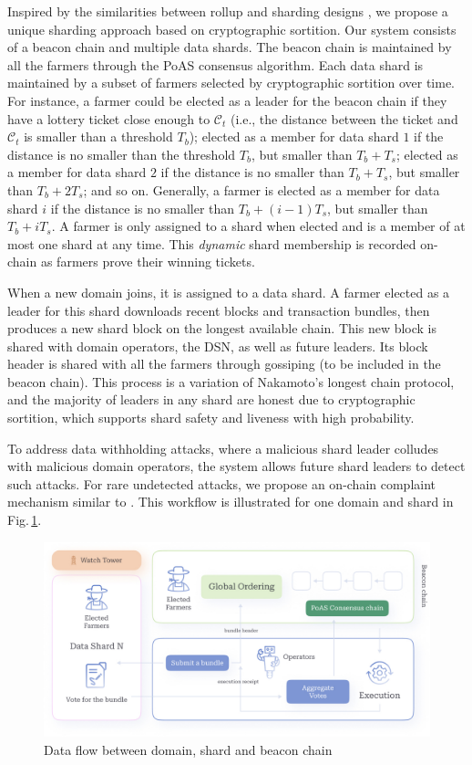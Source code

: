 \documentclass[conference]{IEEEtran}
\begin{document}
Inspired by the similarities between rollup and sharding designs \cite{vitaliklayer22024}, we propose a unique sharding approach based on cryptographic sortition. Our system consists of a beacon chain and multiple data shards. The beacon chain is maintained by all the farmers through the PoAS consensus algorithm. Each data shard is maintained by a subset of farmers selected by cryptographic sortition over time. For instance, a farmer could be elected as a leader for the beacon chain if they have a lottery ticket close enough to $\mathcal{C}_t$ (i.e., the distance between the ticket and $\mathcal{C}_t$ is smaller than a threshold $T_b$); elected as a member for data shard $1$ if the distance is no smaller than the threshold $T_b$, but smaller than $T_b + T_s$; elected as a member for data shard $2$ if the distance is no smaller than $T_b + T_s$, but smaller than $T_b + 2 T_s$; and so on. Generally, a farmer is elected as a member for data shard $i$ if the distance is no smaller than $T_b + (i - 1)T_s$, but smaller than $T_b + iT_s$. A farmer is only assigned to a shard when elected and is a member of at most one shard at any time. This \emph{dynamic} shard membership is recorded on-chain as farmers prove their winning tickets.

When a new domain joins, it is assigned to a data shard. 
A farmer elected as a leader for this shard downloads recent blocks and transaction bundles, then produces a new shard block on the longest available chain. 
This new block is shared with domain operators, the DSN, as well as future leaders.
Its block header is shared with all the farmers through gossiping (to be included in the beacon chain).
This process is a variation of Nakamoto’s longest chain protocol, and the majority of leaders in any shard are honest due to cryptographic sortition, which supports shard safety and liveness with high probability.

To address data withholding attacks, where a malicious shard leader colludes with malicious domain operators, the system allows future shard leaders to detect such attacks. For rare undetected attacks, we propose an on-chain complaint mechanism similar to \cite{tas2023}. This workflow is illustrated for one domain and shard in Fig.\,\ref{fig:scalability}.


\begin{figure}
    \centering
    \includegraphics[width=1\linewidth]{shard.jpg}
 \caption{Data flow between domain, shard and beacon chain}
\label{fig:scalability}
\end{figure} 
\end{document}
